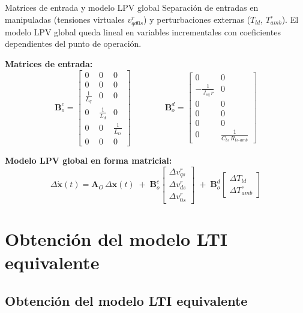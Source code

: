 \documentclass[aspectratio=169,t]{beamer}
\newcommand{\SecPresentacion}{Presentación del problema}
\newcommand{\SecMecanico}{Subsistema mecánico equivalente}
\newcommand{\SecElectromagnetico}{Subsistema electromagnético en coordenadas qd0}
\newcommand{\SecTermico}{Subsistema térmico}
\newcommand{\SecNLGlobal}{Sistema No Lineal Global}
\newcommand{\SecLPV}{Linealización Jacobiana (LPV)}
\newcommand{\SecLTI}{Obtención del modelo LTI equivalente}
\newcommand{\SecAnalisisLTI}{Análisis del modelo LTI aumentado}
\newcommand{\SecDinamica}{Respuesta dinámica en dominio del tiempo}
\newcommand{\SecControlador}{Diseño y análisis del controlador en cascada}
\newcommand{\SecVerifSpecs}{Verificación de desempeño: Especificaciones de operación}
\newcommand{\SecVerifOffset}{Verificación de desempeño: Offset de estado estacionario}
\newcommand{\SecVerifNoIdealidades}{Verificación de desempeño: No idealidades y comportamiento térmico}
\newcommand{\SecDiscretizacion}{Discretización del controlador}
\newcommand{\SecSoftware}{Codificación del software de control}
\newcommand{\AgendaItem}[3]{%
  \ifnum#1=#2
    {\scriptsize\bfseries\color{uncBlue}%
      \hyperlink{sec:#1}{\makebox[2.2em][r]{#1.}\hspace{0.7em}%
      \parbox[t]{0.86\textwidth}{#3}}\par}%
  \else
    {\scriptsize\color{black!26}%
      \hyperlink{sec:#1}{\makebox[2.2em][r]{#1.}\hspace{0.7em}%
      \parbox[t]{0.86\textwidth}{#3}}\par}%
  \fi
  \vspace{0.35mm}%
}
\newcommand{\AgendaBody}[1]{%
    \vspace{3mm}
    {\Large\bfseries\color{uncBlue}Tabla de contenidos\par}
    \vspace{2mm}
    \begin{minipage}{0.94\textwidth}
      \AgendaItem{1}{#1}{\SecPresentacion}
      \AgendaItem{2}{#1}{\SecMecanico}
      \AgendaItem{3}{#1}{\SecElectromagnetico}
      \AgendaItem{4}{#1}{\SecTermico}
      \AgendaItem{5}{#1}\SecNLGlobal
      \AgendaItem{6}{#1}{\SecLPV}
      \AgendaItem{7}{#1}{\SecLTI}
      \AgendaItem{8}{#1}{\SecAnalisisLTI}
      \AgendaItem{9}{#1}{\SecDinamica}
      \AgendaItem{10}{#1}{\SecControlador}
      \AgendaItem{11}{#1}{\SecVerifSpecs}
      \AgendaItem{12}{#1}{\SecVerifOffset}
      \AgendaItem{13}{#1}{\SecVerifNoIdealidades}
      \AgendaItem{14}{#1}{\SecDiscretizacion}
      \AgendaItem{15}{#1}{\SecSoftware}
    \end{minipage}
    \vfill
}
\newcommand{\AgendaSlideTarget}[2]{%
  \begin{frame}[plain]
    \hypertarget{#2}{}%
    \AgendaBody{#1}
  \end{frame}
}
\newcommand{\StartProjectSection}[2]{%
  \section{#2}%
  \subsection{#2}%
  \AgendaSlideTarget{#1}{sec:#1}%
}
\begin{document}
\begin{frame}{Matrices de entrada y modelo LPV global}
{\small\color{uncGray}Separación de entradas en manipuladas (tensiones virtuales $v_{qd0s}^{r}$) y perturbaciones externas ($T_{ld}$, $T_{amb}^\circ$). El modelo LPV global queda lineal en variables incrementales con coeficientes dependientes del punto de operación.}\par
\vspace{3mm}

\textbf{Matrices de entrada:}
\[
\bm{B}_o^c = \begin{bmatrix}
0 & 0 & 0 \\ 0 & 0 & 0 \\ \tfrac{1}{L_q} & 0 & 0 \\ 0 & \tfrac{1}{L_d} & 0 \\ 0 & 0 & \tfrac{1}{L_{ls}} \\ 0 & 0 & 0
\end{bmatrix}
\qquad\qquad
\bm{B}_o^d = \begin{bmatrix}
0 & 0 \\ -\tfrac{1}{J_{eq}\,r} & 0 \\ 0 & 0 \\ 0 & 0 \\ 0 & 0 \\ 0 & \tfrac{1}{C_{ts}\,R_{ts\text{-}amb}}
\end{bmatrix}
\]

\vspace{3mm}
\textbf{Modelo LPV global en forma matricial:}
\footnotesize
\[
\Delta\dot{\bm{x}}(t) = \bm{A}_O\,\Delta\bm{x}(t) \;+\; \bm{B}_o^c\!\begin{bmatrix}\Delta v_{qs}^{r}\\ \Delta v_{ds}^{r}\\ \Delta v_{0s}^{r}\end{bmatrix} \;+\; \bm{B}_o^d\!\begin{bmatrix}\Delta T_{ld}\\ \Delta T_{amb}^\circ\end{bmatrix}
\]
\normalsize
\end{frame}

\StartProjectSection{7}{\SecLTI}
\end{document}
